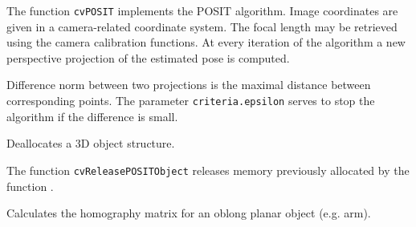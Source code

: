 \begin{description}
\end{description}

The function \texttt{cvPOSIT} implements the POSIT algorithm. Image coordinates are given in a camera-related coordinate system. The focal length may be retrieved using the camera calibration functions. At every iteration of the algorithm a new perspective projection of the estimated pose is computed.

Difference norm between two projections is the maximal distance between corresponding points. The parameter \texttt{criteria.epsilon} serves to stop the algorithm if the difference is small.

\ifC
{}\label{ReleasePOSITObject}

Deallocates a 3D object structure.


\begin{description}
\end{description}

The function \texttt{cvReleasePOSITObject} releases memory previously allocated by the function .

\fi

\label{CalcImageHomography}

Calculates the homography matrix for an oblong planar object (e.g. arm).


\begin{description}
\end{description}

